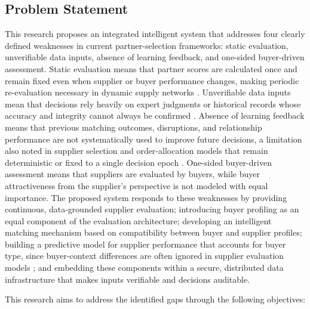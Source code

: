 \documentclass[11pt]{article}
\begin{document}
\subsection{Problem Statement}

This research proposes an integrated intelligent system that addresses four clearly defined weaknesses in current partner-selection frameworks: static evaluation, unverifiable data inputs, absence of learning feedback, and one-sided buyer-driven assessment. Static evaluation means that partner scores are calculated once and remain fixed even when supplier or buyer performance changes, making periodic re-evaluation necessary in dynamic supply networks \cite{ref70}. Unverifiable data inputs mean that decisions rely heavily on expert judgments or historical records whose accuracy and integrity cannot always be confirmed \cite{ref68}. Absence of learning feedback means that previous matching outcomes, disruptions, and relationship performance are not systematically used to improve future decisions, a limitation also noted in supplier selection and order-allocation models that remain deterministic or fixed to a single decision epoch \cite{ref73,ref74}. One-sided buyer-driven assessment means that suppliers are evaluated by buyers, while buyer attractiveness from the supplier's perspective is not modeled with equal importance. The proposed system responds to these weaknesses by providing continuous, data-grounded supplier evaluation; introducing buyer profiling as an equal component of the evaluation architecture; developing an intelligent matching mechanism based on compatibility between buyer and supplier profiles; building a predictive model for supplier performance that accounts for buyer type, since buyer-context differences are often ignored in supplier evaluation models \cite{ref76}; and embedding these components within a secure, distributed data infrastructure that makes inputs verifiable and decisions auditable.

This research aims to address the identified gaps through the following objectives:
\end{document}
